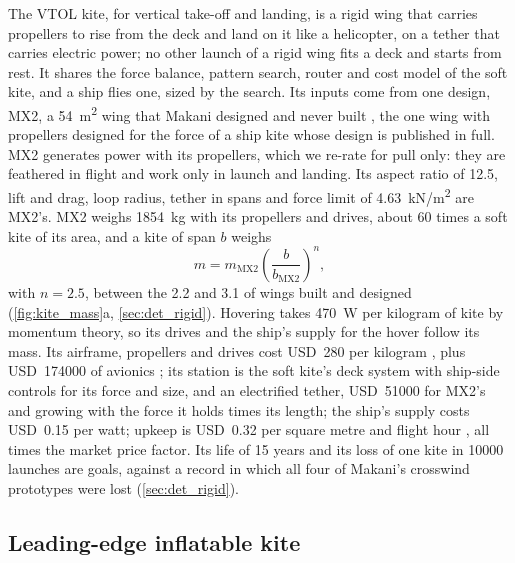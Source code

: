 The VTOL kite, for vertical take-off and landing, is a rigid wing that carries propellers to rise from the deck and land on it like a helicopter, on a tether that carries electric power; no other launch of a rigid wing fits a deck and starts from rest. It shares the force balance, pattern search, router and cost model of the soft kite, and a ship flies one, sized by the search. Its inputs come from one design, MX2, a \SI{54}{m^2} wing that Makani designed and never built \citep{echeverri2020part1}, the one wing with propellers designed for the force of a ship kite whose design is published in full. MX2 generates power with its propellers, which we re-rate for pull only: they are feathered in flight and work only in launch and landing. Its aspect ratio of 12.5, lift and drag, loop radius, tether in spans and force limit of \SI{4.63}{kN/m^2} are MX2's. MX2 weighs \SI{1854}{kg} with its propellers and drives, about 60 times a soft kite of its area, and a kite of span $b$ weighs
\begin{equation}
m = m_\mathrm{MX2}\left(\frac{b}{b_\mathrm{MX2}}\right)^{n},
\label{eq:rigid_mass}
\end{equation}
with $n=2.5$, between the 2.2 and 3.1 of wings built and designed (\cref{fig:kite_mass}a, \cref{sec:det_rigid}). Hovering takes \SI{470}{W} per kilogram of kite by momentum theory, so its drives and the ship's supply for the hover follow its mass. Its airframe, propellers and drives cost USD~280 per kilogram \citep{joshi2025,bauer2018}, plus USD~\num{174000} of avionics \citep{joshi2025}; its station is the soft kite's deck system with ship-side controls for its force and size, and an electrified tether, USD~\num{51000} for MX2's and growing with the force it holds times its length; the ship's supply costs USD~0.15 per watt; upkeep is USD~0.32 per square metre and flight hour \citep{echeverri2020part1}, all times the market price factor. Its life of 15 years and its loss of one kite in \num{10000} launches are goals, against a record in which all four of Makani's crosswind prototypes were lost (\cref{sec:det_rigid}).

\subsection{Leading-edge inflatable kite}
\label{sec:lei_kite}

